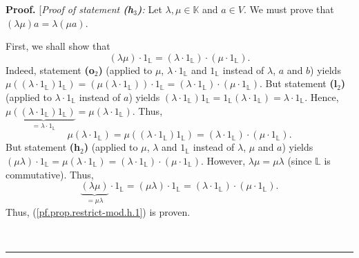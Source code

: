\documentclass[numbers=enddot,12pt,final,onecolumn,notitlepage]{scrartcl}%
\theoremstyle{definition}
\newenvironment{fineprint}{\begin{small}}{\end{small}}
\newenvironment{proof}[1][Proof]{\noindent\textbf{#1.} }{\ \rule{0.5em}{0.5em}}
\begin{document}
\begin{fineprint}
\begin{proof}
[\textit{Proof of statement \textbf{(h}}$_{3}$\textit{\textbf{)}:} Let
$\lambda,\mu\in\mathbb{K}$ and $a\in V$. We must prove that $\left(
\lambda\mu\right)  a=\lambda\left(  \mu a\right)  $.

First, we shall show that
\begin{equation}
\left(  \lambda\mu\right)  \cdot1_{\mathbb{L}}=\left(  \lambda\cdot
1_{\mathbb{L}}\right)  \cdot\left(  \mu\cdot1_{\mathbb{L}}\right)  .
\label{pf.prop.restrict-mod.h.1}%
\end{equation}
Indeed, statement \textbf{(o}$_{2}$\textbf{)} (applied to $\mu$, $\lambda
\cdot1_{\mathbb{L}}$ and $1_{\mathbb{L}}$ instead of $\lambda$, $a$ and $b$)
yields $\mu\left(  \left(  \lambda\cdot1_{\mathbb{L}}\right)  1_{\mathbb{L}%
}\right)  =\left(  \mu\left(  \lambda\cdot1_{\mathbb{L}}\right)  \right)
\cdot1_{\mathbb{L}}=\left(  \lambda\cdot1_{\mathbb{L}}\right)  \cdot\left(
\mu\cdot1_{\mathbb{L}}\right)  $. But statement \textbf{(l}$_{2}$\textbf{)}
(applied to $\lambda\cdot1_{\mathbb{L}}$ instead of $a$) yields $\left(
\lambda\cdot1_{\mathbb{L}}\right)  1_{\mathbb{L}}=1_{\mathbb{L}}\left(
\lambda\cdot1_{\mathbb{L}}\right)  =\lambda\cdot1_{\mathbb{L}}$. Hence,
$\mu\underbrace{\left(  \left(  \lambda\cdot1_{\mathbb{L}}\right)
1_{\mathbb{L}}\right)  }_{=\lambda\cdot1_{\mathbb{L}}}=\mu\left(  \lambda
\cdot1_{\mathbb{L}}\right)  $. Thus,%
\[
\mu\left(  \lambda\cdot1_{\mathbb{L}}\right)  =\mu\left(  \left(  \lambda
\cdot1_{\mathbb{L}}\right)  1_{\mathbb{L}}\right)  =\left(  \lambda
\cdot1_{\mathbb{L}}\right)  \cdot\left(  \mu\cdot1_{\mathbb{L}}\right)  .
\]
But statement \textbf{(h}$_{2}$\textbf{)} (applied to $\mu$, $\lambda$ and
$1_{\mathbb{L}}$ instead of $\lambda$, $\mu$ and $a$) yields $\left(
\mu\lambda\right)  \cdot1_{\mathbb{L}}=\mu\left(  \lambda\cdot1_{\mathbb{L}%
}\right)  =\left(  \lambda\cdot1_{\mathbb{L}}\right)  \cdot\left(  \mu
\cdot1_{\mathbb{L}}\right)  $. However, $\lambda\mu=\mu\lambda$ (since
$\mathbb{L}$ is commutative). Thus,%
\[
\underbrace{\left(  \lambda\mu\right)  }_{=\mu\lambda}\cdot1_{\mathbb{L}%
}=\left(  \mu\lambda\right)  \cdot1_{\mathbb{L}}=\left(  \lambda
\cdot1_{\mathbb{L}}\right)  \cdot\left(  \mu\cdot1_{\mathbb{L}}\right)  .
\]
Thus, (\ref{pf.prop.restrict-mod.h.1}) is proven.


\end{proof}
\end{fineprint}
\end{document}
